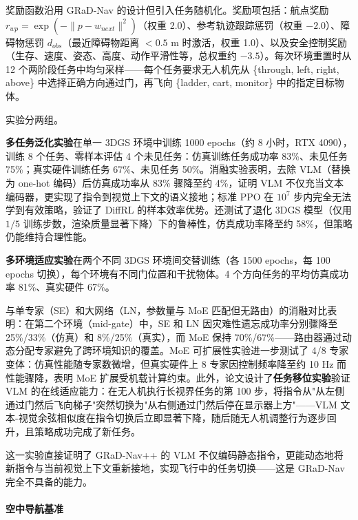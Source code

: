 奖励函数沿用 GRaD-Nav 的设计但引入任务随机化。奖励项包括：航点奖励 $r_{wp} = \exp(-\|p - w_{next}\|^2)$（权重 2.0）、参考轨迹跟踪惩罚（权重 $-2.0$）、障碍物惩罚 $d_{obs}$（最近障碍物距离 $< 0.5$ m 时激活，权重 1.0）、以及安全控制奖励（生存、速度、姿态、高度、动作平滑性等，总权重约 $-3.5$）。每次环境重置时从 12 个两阶段任务中均匀采样——每个任务要求无人机先从 \{through, left, right, above\} 中选择正确方向通过门，再飞向 \{ladder, cart, monitor\} 中的指定目标物体。

实验分两组。

\textbf{多任务泛化实验}在单一 3DGS 环境中训练 1000 epochs（约 8 小时，RTX 4090），训练 8 个任务、零样本评估 4 个未见任务：仿真训练任务成功率 83\%、未见任务 75\%；真实硬件训练任务 67\%、未见任务 50\%。消融实验表明，去除 VLM（替换为 one-hot 编码）后仿真成功率从 83\% 骤降至约 4\%，证明 VLM 不仅充当文本编码器，更实现了指令到视觉上下文的语义接地；标准 PPO 在 $10^7$ 步内完全无法学到有效策略，验证了 DiffRL 的样本效率优势。还测试了退化 3DGS 模型（仅用 $1/5$ 训练步数，渲染质量显著下降）下的鲁棒性，仿真成功率降至约 58\%，但策略仍能维持合理性能。

\textbf{多环境适应实验}在两个不同 3DGS 环境间交替训练（各 1500 epochs，每 100 epochs 切换），每个环境有不同门位置和干扰物体。4 个方向任务的平均仿真成功率 81\%、真实硬件 67\%。

与单专家（SE）和大网络（LN，参数量与 MoE 匹配但无路由）的消融对比表明：在第二个环境（mid-gate）中，SE 和 LN 因灾难性遗忘成功率分别骤降至 25\%/33\%（仿真）和 8\%/25\%（真实），而 MoE 保持 70\%/67\%——路由器通过动态分配专家避免了跨环境知识的覆盖。MoE 可扩展性实验进一步测试了 4/8 专家变体：仿真性能随专家数微增，但真实硬件上 8 专家因控制频率降至约 10 Hz 而性能骤降，表明 MoE 扩展受机载计算约束。此外，论文设计了\textbf{任务移位实验}验证 VLM 的在线适应能力：在无人机执行长视界任务的第 100 步，将指令从"从左侧通过门然后飞向梯子"突然切换为"从右侧通过门然后停在显示器上方"——VLM 文本-视觉余弦相似度在指令切换后立即显著下降，随后随无人机调整行为逐步回升，且策略成功完成了新任务。

这一实验直接证明了 GRaD-Nav++ 的 VLM 不仅编码静态指令，更能动态地将新指令与当前视觉上下文重新接地，实现飞行中的任务切换——这是 GRaD-Nav 完全不具备的能力。

\paragraph{空中导航基准}


